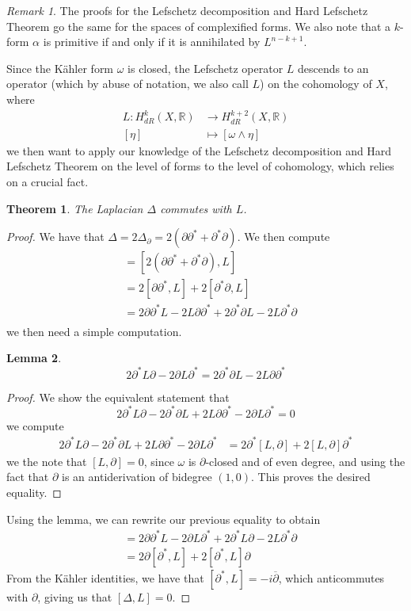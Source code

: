 \documentclass[psamsfonts, 12pt]{amsart}
\newtheorem{thm}{Theorem}[section]
\newtheorem{lem}[thm]{Lemma}
\theoremstyle{definition}
\theoremstyle{remark}
\newtheorem*{rem*}{Remark}
\newcommand{\R}{\mathbb{R}}
\newcommand{\dbar}{\overline{\partial}}
\begin{document}
%
\begin{rem*}
The proofs for the Lefschetz decomposition and Hard Lefschetz Theorem go the same for
the spaces of complexified forms. We also note that a $k$-form $\alpha$ is primitive
if and only if it is annihilated by $L^{n-k+1}$.
\end{rem*}
%
Since the K\"ahler form $\omega$ is closed, the Lefschetz operator $L$ descends
to an operator (which by abuse of notation, we also call $L$) on the cohomology
of $X$, where
\begin{align*}
L : H^k_{dR}(X,\R) &\to H^{k+2}_{dR}(X,\R) \\
[\eta] &\mapsto [\omega \wedge \eta]
\end{align*}
we then want to apply our knowledge of the Lefschetz decomposition and Hard Lefschetz
Theorem on the level of forms to the level of cohomology, which relies on a crucial
fact.
\begin{thm}
The Laplacian $\Delta$ commutes with $L$.
\end{thm}
%
\begin{proof}
We have that
$\Delta = 2\Delta_{\partial } = 2(\partial\partial^* + \partial^*\partial)$. We then
compute
\begin{align*}
[\Delta, L] &= [2(\partial\partial^* + \partial^*\partial), L] \\
&= 2[\partial\partial^*,L] + 2[\partial^*\partial, L] \\
&= 2\partial\partial^* L - 2L\partial\partial^*
+ 2\partial^*\partial L - 2L\partial^*\partial \\
\end{align*}
we then need a simple computation.
%
\begin{lem}
\[
2\partial^*L\partial - 2\partial L\partial^*
= 2\partial^*\partial L - 2L\partial\partial^*
\]
\end{lem}
%
\begin{proof}
We show the equivalent statement that
\[
2\partial^*L\partial - 2\partial^*\partial L
+ 2L\partial\partial^*  - 2\partial L\partial^* = 0
\]
we compute
\begin{align*}
2\partial^*L\partial - 2\partial^*\partial L
+ 2L\partial\partial^*  - 2\partial L\partial^* &= 2\partial^*[L,\partial]
+ 2[L, \partial]\partial^*
\end{align*}
we the note that $[L,\partial] = 0$, since $\omega$ is $\partial$-closed and of
even degree, and using the fact that $\partial$ is an antiderivation of bidegree
$(1,0)$. This proves the desired equality.
\end{proof}
%
Using the lemma, we can rewrite our previous equality to obtain
\begin{align*}
[\Delta,L] &= 2\partial\partial^*L - 2\partial L\partial^* + 2\partial^*L\partial
- 2L\partial^*\partial \\
&= 2\partial[\partial^*, L] + 2[\partial^*, L]\partial
\end{align*}
From the K\"ahler identities, we have that $[\partial^*, L] = -i\dbar$, which
anticommutes with $\partial$, giving us that $[\Delta, L] = 0$.
\end{proof}
\end{document}
